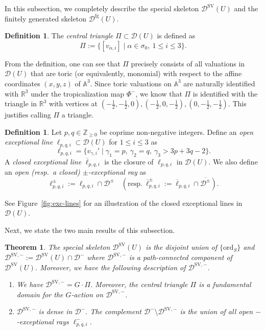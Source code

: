 \documentclass[reqno, 12pt]{amsart}
\newtheorem{thm}[prop]{Theorem}
\theoremstyle{definition}
\newtheorem{defn}[prop]{Definition}
\newcommand{\bR}{\mathbb{R}}
\newcommand{\bA}{\mathbb{A}}
\newcommand{\bZ}{\mathbb{Z}}
\newcommand{\cD}{\mathcal{D}}
\newcommand{\ord}{\mathrm{ord}}
\newcommand{\SV}{\mathrm{SV}}
\newcommand{\rfg}{\mathrm{fg}}
\newcommand{\oell}{\overline{\ell}}
\numberwithin{equation}{section}
\begin{document}
In this subsection, we completely describe the special skeleton $\cD^{\SV}(U)$ and the finitely generated skeleton $\cD^{\rfg}(U)$.

\begin{defn}
    The \emph{central triangle} $\Pi\subset \cD(U)$  is defined as 
    \[
    \Pi:= \{[v_{\alpha,i}]\mid \alpha\in \sigma_0, ~1\leq i \leq 3\}.
    \]
\end{defn}

From the definition, one can see that $\Pi$ precisely consists of all valuations in $\cD(U)$ that are toric (or equivalently, monomial) with respect to the affine coordinates $(x,y,z)$ of $\bA^3$. Since toric valuations on $\bA^3$ are naturally identified with $\bR^3$ under the tropicalization map $\Phi^-$, we know that  $\Pi$ is identified with the triangle in $\bR^3$ with vertices at $(-\frac{1}{2},-\frac{1}{2},0), (-\frac{1}{2},0,-\frac{1}{2}), (0, -\frac{1}{2}, -\frac{1}{2})$. This justifies calling $\Pi$  a triangle.

\begin{defn}
    Let $p,q\in \bZ_{\geq 0}$ be coprime non-negative integers. Define an \emph{open exceptional line} $\ell_{p,q,i}\subset \cD(U)$ for $1\leq i\leq 3$ as
    \[
    \ell_{p,q,i} = \{v_{\gamma,i}'\mid \gamma_1= p, ~\gamma_2 = q,~ \gamma_3> 3p+3q -2\}. 
    \]
    A \emph{closed exceptional line} $\oell_{p,q,i}$ is the closure of $\ell_{p,q,i}$ in $ \cD(U)$. We also define an \emph{open (resp.\ a closed) $\pm$-exceptional ray} as 
    \[
    \ell_{p,q,i}^{\pm} := \ell_{p,q,i}\cap \cD^{\pm}\quad (\textrm{resp.}~\oell_{p,q,i}^{\pm} := \oell_{p,q,i}\cap \overline{\cD^{\pm}}).
    \]
\end{defn}

See Figure~\ref{fig:exc-lines} for an illustration of the closed exceptional
lines in $\cD(U)$.

Next, we state the two main results of this subsection.

\begin{thm}\label{thm:markov-special}
The special skeleton $\cD^{\SV}(U)$ is the disjoint union of $\{\ord_S\}$ and $\cD^{\SV, -} := \cD^{\SV}(U)\cap \cD^-$ where $\cD^{\SV,-}$ is a path-connected component of $\cD^{\SV}(U)$. Moreover, we have the following description of $\cD^{\SV,-}$.
\begin{enumerate}
    \item We have $\cD^{\SV,-} = G\cdot \Pi$. Moreover, the central triangle $\Pi$ is a fundamental domain for the $G$-action on $\cD^{\SV,-}$.
    \item $\cD^{\SV,-}$ is dense in $\cD^{-}$. The complement  $\cD^-\setminus \cD^{\SV,-}$ is the union of all open $-$-exceptional rays $\ell_{p,q,i}^{-}$.
\end{enumerate}
\end{thm}
\end{document}
